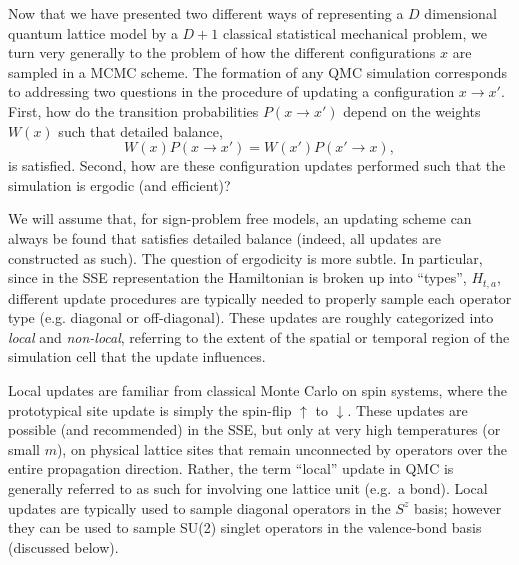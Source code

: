 \documentclass[vecphys]{svmult}
\begin{document}
Now that we have presented two different ways of representing a $D$ dimensional quantum lattice model by a $D+1$ classical statistical mechanical problem, we turn very generally to the problem of how the different configurations $x$ are sampled in a MCMC scheme.
The formation of any QMC simulation corresponds to addressing two questions in the procedure of updating a configuration $x \rightarrow x'$. First, how do the transition probabilities $P(x \rightarrow x')$ depend on the weights $W(x)$ such that detailed balance,
\begin{equation}
 W(x)P(x \rightarrow x') = W(x')P(x' \rightarrow x), \label{Melko:detb}
 \end{equation}
 is satisfied. Second, how are these configuration updates performed such that the simulation is ergodic (and efficient)?

We will assume that, for sign-problem free models, an updating scheme can always be found that satisfies detailed balance (indeed, all updates are constructed as such).  The question of ergodicity is more subtle.  
In particular, since in the SSE representation the Hamiltonian is broken up into ``types'', $H_{t,a}$, different update procedures are typically needed to properly sample each operator type (e.g. diagonal or off-diagonal).  These updates are roughly categorized into {\em local} and {\em non-local}, referring to the extent of the spatial or temporal region of the simulation cell that the update influences.

Local updates are familiar from classical Monte Carlo on spin systems, where the prototypical site update is simply the spin-flip $\uparrow$ to $\downarrow$.  These updates are possible (and recommended) in the SSE, but only at very high temperatures (or small $m$), on physical lattice sites that remain unconnected by operators over the entire propagation direction.  Rather, the term ``local'' update in QMC is generally referred to as such for involving one lattice unit (e.g.~a bond).  Local updates are typically used to sample diagonal operators in the $S^z$ basis; however they can be used to sample SU(2) singlet operators in the valence-bond basis (discussed below).
\end{document}
